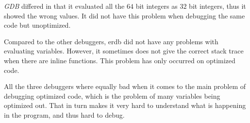 \emph{GDB} differed in that it evaluated all the $64$ bit integers as $32$ bit integers, thus it showed the wrong values.
It did not have this problem when debugging the same code but unoptimized.


Compared to the other debuggers, \gls{erdb} did not have any problems with evaluating variables.
However, it sometimes does not give the correct stack trace when there are inline functions.
This problem has only occurred on optimized code.


All the three debuggers where equally bad when it comes to the main problem of debugging optimized code, which is the problem of many variables being optimized out.
That in turn makes it very hard to understand what is happening in the program, and thus hard to debug.


